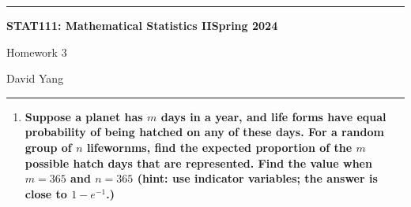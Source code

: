 \documentclass[11pt]{article}
\begin{document}
	\hrule
	\begin{center}
        \textbf{STAT111: Mathematical Statistics II}\hfill \textbf{Spring 2024}\newline

		{\Large Homework 3}

		David Yang
	\end{center}

\hrule

\vspace{1em}

\begin{enumerate}
    \item \textbf{Suppose a planet has $m$ days in a year, and life forms have equal probability of being hatched on any of these days. For a random group of $n$
    lifewornms, find the expected proportion of the $m$ possible hatch days that are represented. Find the value when $m = 365$ and $n = 365$ (hint: use indicator variables; the answer is close to $1 - e^{-1}$.)}

    
\end{enumerate}
\end{document}
